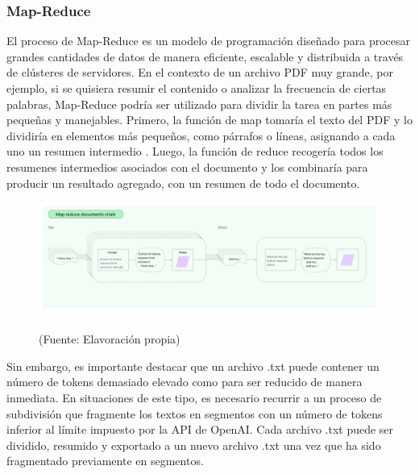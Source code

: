 \subsubsection{Map-Reduce}


\par El proceso de Map-Reduce es un modelo de programación diseñado para procesar grandes cantidades de datos de manera eficiente, 
escalable y distribuida a través de clústeres de servidores. En el contexto de un archivo PDF muy grande, por ejemplo, si se quisiera resumir 
el contenido o analizar la frecuencia de ciertas palabras, Map-Reduce podría ser utilizado para dividir la tarea en partes más pequeñas y manejables. 
Primero, la función de map tomaría el texto del PDF y lo dividiría en elementos más pequeños, como párrafos o líneas, 
asignando a cada uno un resumen intermedio \cite{mapreduce}. Luego, la función de reduce recogería todos los resumenes intermedios asociados con el documento 
y los combinaría para producir un resultado agregado, con un resumen de todo el documento. 


\begin{figure}[ht!]
    \centering
    \includegraphics[width=.4\textwidth]{figures/huemul_mapreduce.jpg}
    \caption[]{\\
    {\scriptsize (Fuente: Elavoración propia)}}
    \label{fig:chatbot1}
\end{figure}

\par Sin embargo, es importante destacar que un archivo .txt puede contener un número de tokens demasiado elevado como para ser 
reducido de manera inmediata. En situaciones de este tipo, es necesario recurrir a un proceso de subdivisión que fragmente los 
textos en segmentos con un número de tokens inferior al límite impuesto por la API de OpenAI.
Cada archivo .txt puede ser dividido, 
resumido y exportado a un nuevo archivo .txt una vez que ha sido fragmentado previamente en segmentos.

